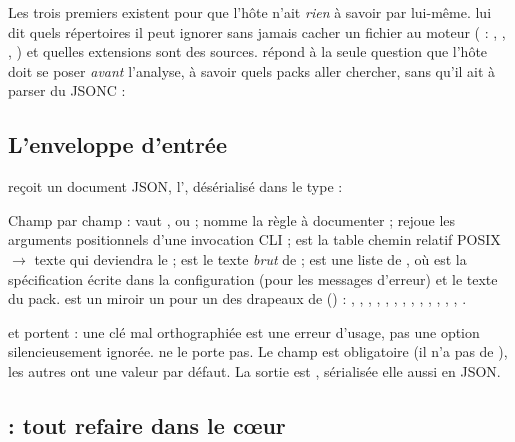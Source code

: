 Les trois premiers existent pour que l'hôte n'ait \emph{rien} à savoir par lui-même.  lui dit quels répertoires il peut ignorer sans jamais cacher un fichier au moteur ( : , , , ) et quelles extensions sont des sources.  répond à la seule question que l'hôte doit se poser \emph{avant} l'analyse, à savoir quels packs aller chercher, sans qu'il ait à parser du JSONC :


\subsection{L'enveloppe d'entrée}

 reçoit un document JSON, l', désérialisé dans le type  :


Champ par champ :  vaut ,  ou  ;  nomme la règle à documenter ;  rejoue les arguments positionnels d'une invocation CLI ;  est la table \og chemin relatif POSIX $\rightarrow$ texte\fg{} qui deviendra le  ;  est le texte \emph{brut} de  ;  est une liste de , où  est la spécification écrite dans la configuration (pour les messages d'erreur) et  le texte du pack.  est un miroir un pour un des drapeaux de  () : , , , , , , , , , , , , , .

 et  portent  : une clé mal orthographiée est une erreur d'usage, pas une option silencieusement ignorée.  ne le porte pas. Le champ  est obligatoire (il n'a pas de ), les autres ont une valeur par défaut. La sortie est , sérialisée elle aussi en JSON.

\subsection{ : tout refaire dans le cœur}

